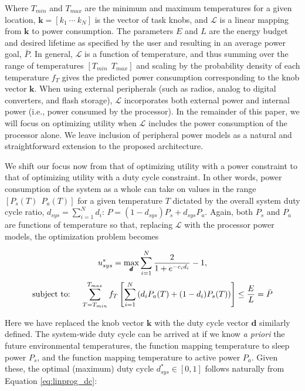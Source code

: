 Where $T_{min}$ and $T_{max}$ are the minimum and maximum temperatures for a given location, $\pmb{k} = [k_1 ~\cdots~ k_N]$ is the vector of task knobs, and $\mathcal{L}$  is a linear mapping from $\pmb{k}$ to power consumption.  The parameters $E$ and $L$ are the energy budget and desired lifetime as specified by the user and resulting in an average power goal, $\bar{P}$. In general, $\mathcal{L}$ is a function of temperature, and thus summing over the range of temperatures $[T_{min}~~T_{max}]$ and scaling by the probability density of each temperature $f_T$ gives the predicted power consumption corresponding to the knob vector $\pmb{k}$. When using external peripherals (such as radios, analog to digital converters, and flash storage), $\mathcal{L}$ incorporates both external power and internal power (i.e., power consumed by the processor).  In the remainder of this paper, we will focus on optimizing utility when $\mathcal{L}$ includes the power consumption of the processor alone.  We leave inclusion of peripheral power models as a natural and straightforward extension to the proposed architecture. 

We shift our focus now from that of optimizing utility with a power constraint to that of optimizing utility with a duty cycle constraint.  In other words, power consumption of the system as a whole can take on values in the range $[P_s(T) ~~P_a(T)]$ for a given temperature $T$ dictated by the overall system duty cycle ratio, $d_{sys} = \sum_{i=1}^Nd_i$: $P = (1-d_{sys})P_s + d_{sys}P_a$. Again, both $P_s$ and $P_a$ are functions of temperature so that, replacing $\mathcal{L}$ with the processor power models, the optimization problem becomes

\begin{equation}
\label{eq:linprog_dc}
u_{sys}^* = \max_{\pmb{d}} \sum_{i=1}^N{ 2\over { 1 + e^{-c_id_i }} }- 1,
\end{equation}
\begin{align*}
\text{subject to:~~~~} &\sum_{T=T_{min}}^{T_{max}}f_T\left[\sum_{i=1}^N\left( d_iP_a(T) + (1-d_i)P_s(T)\right)\right] \le {E\over L} = \bar{P} \\ 
\end{align*}

Here we have replaced the knob vector $\pmb{k}$ with the duty cycle vector $\pmb{d}$ similarly defined.  The system-wide duty cycle can be arrived at if we know \emph{a priori} the future environmental temperatures, the function mapping temperature to sleep power $P_s$, and the function mapping temperature to active power $P_a$. Given these, the optimal (maximum)  duty cycle $d_{sys}^* \in [0,1]$ follows naturally from Equation \ref{eq:linprog_dc}: 

